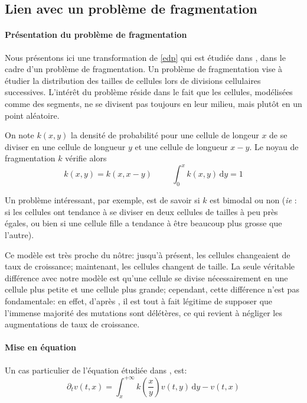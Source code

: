 \documentclass[12pt]{article}
\newcommand{\pth}[1]{\left(#1\right)}
\newcommand{\esp}{\hspace{1cm}}
\newcommand{\ie}{\emph{ie} }
\newcommand{\de}{\,\mathrm{d}}
\newcommand{\dr}{\partial}
\begin{document}
\FloatBarrier
\subsection{Lien avec un problème de fragmentation}

\paragraph{Présentation du problème de fragmentation}
Nous présentons ici une transformation de \eqref{edp} qui est étudiée dans \cite{md1}, \cite{md2} dans le cadre d'un problème de fragmentation. Un problème de fragmentation vise à étudier la distribution des tailles de cellules lors de divisions cellulaires successives. L'intérêt du problème réside dans le fait que les cellules, modélisées comme des segments, ne se divisent pas toujours en leur milieu, mais plutôt en un point aléatoire.

On note $k(x,y)$ la densité de probabilité pour une cellule de longeur $x$ de se diviser en une cellule de longueur $y$ et une cellule de longueur $x-y$. Le noyau de fragmentation $k$ vérifie alors \[k(x,y)=k(x,x-y)\esp \int_0^xk(x,y)\de y=1\]

Un problème intéressant, par exemple, est de savoir si $k$ est bimodal ou non (\ie: si les cellules ont tendance à se diviser en deux cellules de tailles à peu près égales, ou bien si une cellule fille a tendance à être beaucoup plus grosse que l'autre).

Ce modèle est très proche du nôtre: jusqu'à présent, les cellules changeaient de taux de croissance; maintenant, les cellules changent de taille. La seule véritable différence avec notre modèle est qu'une cellule se divise nécessairement en une cellule plus petite et une cellule plus grande; cependant, cette différence n'est pas fondamentale: en effet, d'après \cite{rob}, il est tout à fait légitime de supposer que l'immense majorité des mutations sont délétères, ce qui revient à négliger les augmentations de taux de croissance.

\paragraph{Mise en équation} 

Un cas particulier de l'équation étudiée dans \cite{md1}, \cite{md2} est:
\begin{equation}\label{edp_frag}
\dr_tv(t,x)=\int_x^{+\infty}k\pth{\frac{x}{y}}v(t,y)\de y-v(t,x)
\end{equation}
\end{document}
